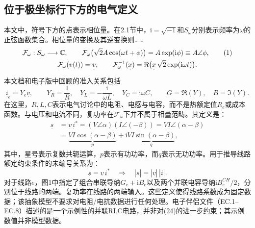 \documentclass{article}
\begin{document}
\subsection*{位于极坐标行下方的电气定义}
本文中，符号下方的点表示相位量。在2.1节中，$\mathrm i=\sqrt{-1}$和$S_\omega$分别表示频率为$\omega$的正弦函数集合。相位量的变换及其逆变换则……
\begin{gather}
\mathcal F_\omega:S_\omega\longrightarrow\mathbb C,\qquad
\mathcal F_\omega\bigl(\sqrt2 A\cos(\omega t+\phi)\bigr)
=A\exp(\mathrm i\phi)\equiv A\angle\phi,\tag{1}\\
\mathcal F_\omega(v(t))=\underset{\cdot}{v},\qquad
\mathcal F_\omega^{-1}(\underset{\cdot}{x})
=\Re\bigl(\underset{\cdot}{x}\,\sqrt2\exp(\mathrm i\omega t)\bigr).\notag
\end{gather}
本文档和电子版中回顾的准入关系包括
\[
\underset{\cdot}{i}_e=Y_e\underset{\cdot}{v},\qquad
Y_R=\frac1R,\quad Y_L=-\frac{\mathrm i}{\omega L},\quad Y_C=\mathrm i\omega C,
\qquad G=\Re(Y),\quad B=\Im(Y).
\]
在这里，$R,L,C$表示电气讨论中的电阻、电感与电容，而不是热额定值$R_e$或成本函数。与电压和电流不同，复功率在$\mathcal F_\omega$下并不属于相量范畴。其定义是：
\begin{equation}
\begin{aligned}
\underset{\cdot}{s}
&=\underset{\cdot}{v}\,\underset{\cdot}{i}^{*}
=(V\angle\alpha)(I\angle(-\beta))
=VI\angle(\alpha-\beta)\\
&=\underbrace{VI\cos(\alpha-\beta)}_{p}
+\mathrm i\underbrace{VI\sin(\alpha-\beta)}_{q},
\end{aligned}\tag{3}
\end{equation}
其中，星号表示复数共轭运算，$p$表示有功功率，而$q$表示无功功率。用于推导线路额定约束条件的未编号关系为：
\[
\underset{\cdot}{s}=\underset{\cdot}{v}\,\underset{\cdot}{i}^{*}
\quad\Longrightarrow\quad
|\underset{\cdot}{s}|=|\underset{\cdot}{v}|\,|\underset{\cdot}{i}|.
\]
对于线路$e$，图1中指定了组合串联导纳$G_e+\mathrm i B_e$以及两个并联电容导纳$\mathrm i B_e^{CH}/2$，分别位于线路的两端。复功率在线路的两端输入。这些定义使得线路系数成为固定数据；该抽象模型不要求对电阻/电抗数据进行任何处理。电子伴侣文件（EC.1–EC.8）描述的是一个示例性的并联RLC电路，并非对(24)的进一步约束；其示例数值并非模型数据。
\end{document}
